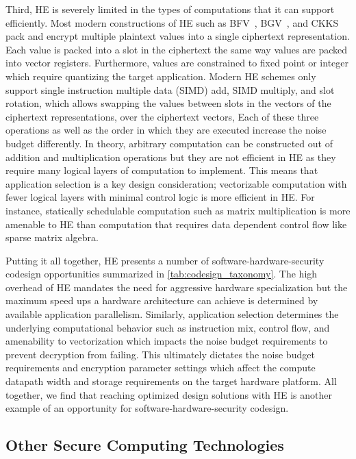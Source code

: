 Third, HE is severely limited in the types of computations that it can support efficiently.
Most modern constructions of HE such as BFV~\cite{bfv}, BGV~\cite{bgv}, and CKKS~\cite{ckks} pack and encrypt multiple plaintext values into a single ciphertext representation.
Each value is packed into a slot in the ciphertext the same way values are packed into vector registers.
Furthermore, values are constrained to fixed point or integer which require quantizing the target application.
Modern HE schemes only support single instruction multiple data (SIMD) add, SIMD multiply,
and slot rotation, which allows swapping the values between slots in the vectors of the ciphertext representations,
over the ciphertext vectors,
Each of these three operations as well as the order in which they are executed increase the noise budget differently.
In theory, arbitrary computation can be constructed out of addition and multiplication operations but they are not efficient in HE as they require many logical layers of computation to implement.
This means that application selection is a key design consideration; vectorizable computation with fewer logical layers with minimal control logic is more efficient in HE.
For instance, statically schedulable computation such as matrix multiplication is more amenable to HE than computation that requires data dependent control flow like sparse matrix algebra.

Putting it all together, HE presents a number of software-hardware-security codesign opportunities summarized in \autoref{tab:codesign_taxonomy}.
The high overhead of HE mandates the need for aggressive hardware specialization but the maximum speed ups a hardware architecture can achieve is determined by available application parallelism.
Similarly, application selection determines the underlying computational behavior such as instruction mix, control flow, and amenability to vectorization which impacts the noise budget requirements to prevent decryption from failing.
This ultimately dictates the noise budget requirements and encryption parameter settings which affect the compute datapath width and storage requirements on the target hardware platform.
All together, we find that reaching optimized design solutions with HE is another example of an opportunity for software-hardware-security codesign.

\subsection{Other Secure Computing Technologies}

